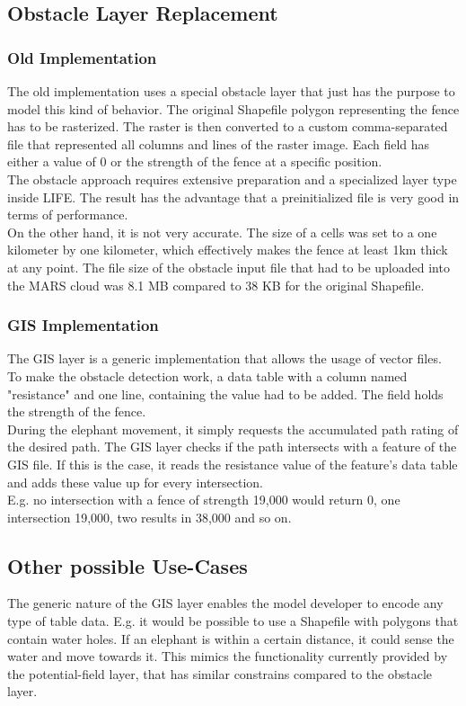 \subsection{Obstacle Layer Replacement}

\subsubsection{Old Implementation}
The old implementation uses a special obstacle layer that just has the purpose to model this kind of behavior. The original Shapefile polygon representing the fence has to be rasterized. The raster is then converted to a custom comma-separated file that represented all columns and lines of the raster image. Each field has either a value of 0 or the strength of the fence at a specific position.\\
The obstacle approach requires extensive preparation and a specialized layer type inside LIFE. The result has the advantage that a preinitialized file is very good in terms of performance.\\
On the other hand, it is not very accurate. The size of a cells was set to a one kilometer by one kilometer, which effectively makes the fence at least 1km thick at any point. The file size of the obstacle input file that had to be uploaded into the MARS cloud was 8.1 MB compared to 38 KB for the original Shapefile.

\subsubsection{GIS  Implementation}
The GIS layer is a generic implementation that allows the usage of vector files. To make the obstacle detection work, a data table with a column named "resistance" and one line, containing the value had to be added. The field holds the strength of the fence.\\
During the elephant movement, it simply requests the accumulated path rating of the desired path. The GIS layer checks if the path intersects with a feature of the GIS file. If this is the case, it reads the resistance value of the feature's data table and adds these value up for every intersection.\\
E.g. no intersection with a fence of strength 19,000 would return 0, one intersection 19,000, two results in 38,000 and so on.\\


\subsection{Other possible Use-Cases}
The generic nature of the GIS layer enables the model developer to encode any type of table data. E.g. it would be possible to use a Shapefile with polygons that contain water holes. If an elephant is within a certain distance, it could sense the water and move towards it. This mimics the functionality currently provided by the potential-field layer, that has similar constrains compared to the obstacle layer.
